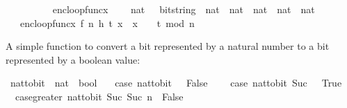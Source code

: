 \begin{isabellebody}
\ \ \ \ \ \ \ \ {\isacharparenright}{\kern0pt}{\isachardoublequoteclose}\isanewline
\isanewline
\isanewline
\isanewline
\isanewline
{}\isamarkupfalse%
\ enc{\isacharunderscore}{\kern0pt}loop{\isacharunderscore}{\kern0pt}func{\isacharunderscore}{\kern0pt}x\ \isanewline
\ \ {\isacharcolon}{\kern0pt}{\isacharcolon}{\kern0pt}\ {\isachardoublequoteopen}{\isacharparenleft}{\kern0pt}{\isacharparenleft}{\kern0pt}nat\ \ {\isacharequal}{\kern0pt}{\isachargreater}{\kern0pt}\ bitstring{\isacharparenright}{\kern0pt}\ {\isasymtimes}\ nat\ {\isasymtimes}\ nat\ {\isasymtimes}\ nat{\isacharparenright}{\kern0pt}\ {\isasymRightarrow}\ nat\ {\isasymRightarrow}\ nat{\isachardoublequoteclose}\ \isanewline
\ \ \isanewline
\ \ \ {\isachardoublequoteopen}enc{\isacharunderscore}{\kern0pt}loop{\isacharunderscore}{\kern0pt}func{\isacharunderscore}{\kern0pt}x\ {\isacharparenleft}{\kern0pt}f{\isacharcomma}{\kern0pt}\ n{\isacharcomma}{\kern0pt}\ h{\isacharcomma}{\kern0pt}\ t{\isacharparenright}{\kern0pt}\ x\ {\isacharequal}{\kern0pt}\ x\ {\isacharcircum}{\kern0pt}\ {\isacharparenleft}{\kern0pt}{}\ {\isacharcircum}{\kern0pt}\ t{\isacharparenright}{\kern0pt}\ mod\ n{\isachardoublequoteclose}%
\begin{isamarkuptext}%
A simple function to convert a bit represented by a natural number to a bit represented by a 
boolean value:%
\end{isamarkuptext}\isamarkuptrue%
\isamarkupfalse%
\ nat{\isacharunderscore}{\kern0pt}to{\isacharunderscore}{\kern0pt}bit\ {\isacharcolon}{\kern0pt}{\isacharcolon}{\kern0pt}\ {\isachardoublequoteopen}nat\ {\isasymRightarrow}\ bool{\isachardoublequoteclose}\ \isanewline
\ \ case{\isacharunderscore}{\kern0pt}{}{\isacharcolon}{\kern0pt}\ {\isachardoublequoteopen}nat{\isacharunderscore}{\kern0pt}to{\isacharunderscore}{\kern0pt}bit\ {}\ {\isacharequal}{\kern0pt}\ False{\isachardoublequoteclose}\ {\isacharbar}{\kern0pt}\ \isanewline
\ \ case{\isacharunderscore}{\kern0pt}{}{\isacharcolon}{\kern0pt}\ {\isachardoublequoteopen}nat{\isacharunderscore}{\kern0pt}to{\isacharunderscore}{\kern0pt}bit\ {\isacharparenleft}{\kern0pt}Suc\ {}{\isacharparenright}{\kern0pt}\ {\isacharequal}{\kern0pt}\ True{\isachardoublequoteclose}\ {\isacharbar}{\kern0pt}\isanewline
\ \ case{\isacharunderscore}{\kern0pt}greater{\isacharcolon}{\kern0pt}\ {\isachardoublequoteopen}nat{\isacharunderscore}{\kern0pt}to{\isacharunderscore}{\kern0pt}bit\ {\isacharparenleft}{\kern0pt}Suc\ {\isacharparenleft}{\kern0pt}Suc\ n{\isacharparenright}{\kern0pt}{\isacharparenright}{\kern0pt}\ {\isacharequal}{\kern0pt}\ False{\isachardoublequoteclose}%

\end{isabellebody}

